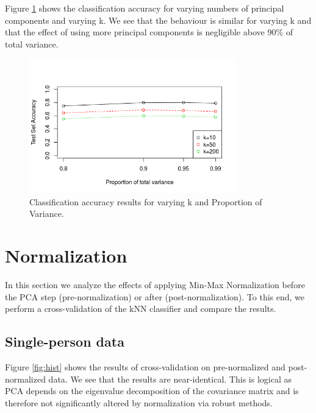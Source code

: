 \documentclass[paper=a4, fontsize=11pt]{scrartcl} %
\begin{document}
Figure \ref{fig:acc} shows the classification accuracy for varying numbers of principal components and varying k. We see that the behaviour is similar for varying k and that the effect of using more principal components is negligible above 90\% of total variance.

\begin{figure}[h]
	\centering
	\includegraphics[width=0.8\textwidth]{accuracy2.png}
	\caption{Classification accuracy results for varying k and Proportion of Variance.}
	\label{fig:acc}
\end{figure}


\section{Normalization}
In this section we analyze the effects of applying Min-Max Normalization before the PCA step (pre-normalization) or after (post-normalization). To this end, we perform a cross-validation of the kNN classifier and compare the results.\par
\clearpage
\subsection{Single-person data}
Figure \ref{fig:hist} shows the results of cross-validation on pre-normalized and post-normalized data. We see that the results are near-identical. This is logical as PCA depends on the eigenvalue decomposition of the covariance matrix and is therefore not significantly altered by normalization via robust methods.
\end{document}

